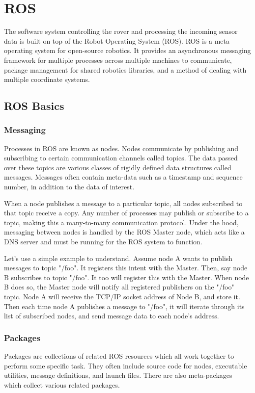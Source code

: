 \chapter{ROS}

The software system controlling the rover and processing the incoming sensor data is built on top of the Robot Operating System (ROS). ROS is a meta operating system for open-source robotics. It provides an asynchronous messaging framework for multiple processes across multiple machines to communicate, package management for shared robotics libraries, and a method of dealing with multiple coordinate systems.

\section{ROS Basics}

\subsection{Messaging}

Processes in ROS are known as nodes. Nodes communicate by publishing and subscribing to certain communication channels called topics. The data passed over these topics are various classes of rigidly defined data structures called messages. Messages often contain meta-data such as a timestamp and sequence number, in addition to the data of interest.

When a node publishes a message to a particular topic, all nodes subscribed to that topic receive a copy. Any number of processes may publish or subscribe to a topic, making this a many-to-many communication protocol. Under the hood, messaging between nodes is handled by the ROS Master node, which acts like a DNS server and must be running for the ROS system to function. 

Let's use a simple example to understand. Assume node A wants to publish messages to topic "/foo". It registers this intent with the Master. Then, say node B subscribes to topic "/foo". It too will register this with the Master. When node B does so, the Master node will notify all registered publishers on the "/foo" topic. Node A will receive the TCP/IP socket address of Node B, and store it. Then each time node A publishes a message to "/foo", it will iterate through its list of subscribed nodes, and send message data to each node's address.

\subsection{Packages}
Packages are collections of related ROS resources which all work together to perform some specific task. They often include source code for nodes, executable utilities, message definitions, and launch files. There are also meta-packages which collect various related packages.

